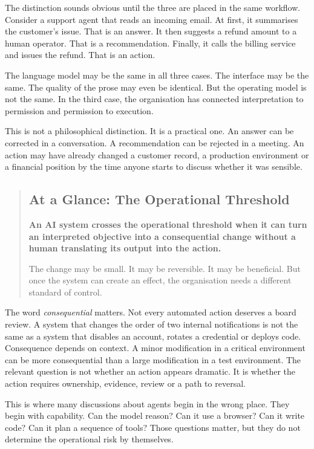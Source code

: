 The distinction sounds obvious until the three are placed in the same
workflow. Consider a support agent that reads an incoming email. At
first, it summarises the customer's issue. That is an answer. It then
suggests a refund amount to a human operator. That is a recommendation.
Finally, it calls the billing service and issues the refund. That is an
action.

The language model may be the same in all three cases. The interface may
be the same. The quality of the prose may even be identical. But the
operating model is not the same. In the third case, the organisation has
connected interpretation to permission and permission to execution.

This is not a philosophical distinction. It is a practical one. An
answer can be corrected in a conversation. A recommendation can be
rejected in a meeting. An action may have already changed a customer
record, a production environment or a financial position by the time
anyone starts to discuss whether it was sensible.

\begin{quote}
\subsection{At a Glance: The Operational
Threshold}\label{at-a-glance-the-operational-threshold}

\textbf{An AI system crosses the operational threshold when it can turn
an interpreted objective into a consequential change without a human
translating its output into the action.}

The change may be small. It may be reversible. It may be beneficial. But
once the system can create an effect, the organisation needs a different
standard of control.
\end{quote}

The word \emph{consequential} matters. Not every automated action
deserves a board review. A system that changes the order of two internal
notifications is not the same as a system that disables an account,
rotates a credential or deploys code. Consequence depends on context. A
minor modification in a critical environment can be more consequential
than a large modification in a test environment. The relevant question
is not whether an action appears dramatic. It is whether the action
requires ownership, evidence, review or a path to reversal.

This is where many discussions about agents begin in the wrong place.
They begin with capability. Can the model reason? Can it use a browser?
Can it write code? Can it plan a sequence of tools? Those questions
matter, but they do not determine the operational risk by themselves.

